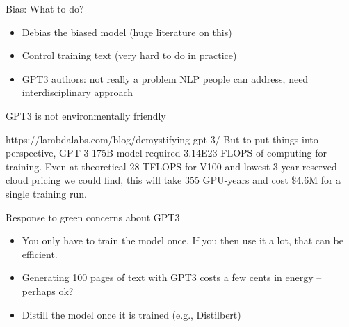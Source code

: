 
\begin{vbframe}{Bias: What to do?}

\vfill

  \begin{itemize}
\item Debias the biased model (huge literature on this)
\item Control training text (very hard to do in practice)
\item GPT3 authors: not really a problem NLP people
can address, need interdisciplinary approach
    \end{itemize}

\vfill

\end{vbframe}



\begin{vbframe}{GPT3 is not environmentally friendly}

\vfill

  \begin{block}{https://lambdalabs.com/blog/demystifying-gpt-3/}
      But to put things into perspective, GPT-3 175B model
      required 3.14E23 FLOPS of computing for training. Even
      at theoretical 28 TFLOPS for V100 and lowest 3 year
      reserved cloud pricing we could find, this will take
      355 GPU-years and cost \$4.6M for a single training
      run.
  \end{block}

\vfill

\end{vbframe}



\begin{vbframe}{Response to green concerns about GPT3}

\vfill

  \begin{itemize}
\item You only have to train the model once. If you
then use it a lot, that can be efficient.
\item Generating 100 pages of text with GPT3 costs a
few cents in energy -- perhaps ok?
\item Distill the model once it is trained (e.g., Distilbert)
    \end{itemize}
    
\vfill

\end{vbframe}

\endlecture

